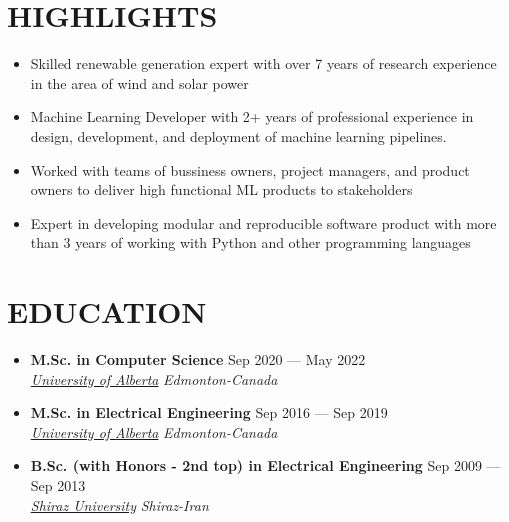 \documentclass[11pt,a4paper,sans]{moderncv} %
\begin{document}
	
	\makecvtitle
	

    \section{HIGHLIGHTS}
    \begin{itemize}
    	\item Skilled renewable generation expert with over 7 years of research experience in the area of wind and solar power
    	\item Machine Learning Developer with 2+ years of professional experience in design, development, and deployment of machine learning pipelines.
    	\item Worked with teams of bussiness owners, project managers, and product owners to deliver high functional ML products to stakeholders
    	\item Expert in developing modular and reproducible software product with more than 3 years of working with Python and other programming languages
    \end{itemize}
	
	\section{EDUCATION}

	\begin{itemize}
		\item \textbf{M.Sc. in Computer Science} \hfill Sep 2020 --- May 2022 \\ 
		\href{https://ualberta.ca/}{ \emph{University of Alberta}} \hfill \emph{Edmonton-Canada}
		
		\item \textbf{M.Sc. in Electrical Engineering} \hfill Sep 2016 --- Sep 2019 \\ 
		\href{https://ualberta.ca/}{ \emph{University of Alberta}} \hfill \emph{Edmonton-Canada}
		
		\item \textbf{B.Sc. (with Honors - 2nd top) in Electrical Engineering} \hfill Sep 2009 --- Sep 2013 \\ 
		\href{https://ualberta.ca/}{ \emph{Shiraz University}} \hfill \emph{Shiraz-Iran}

	\end{itemize}
	
\end{document}
